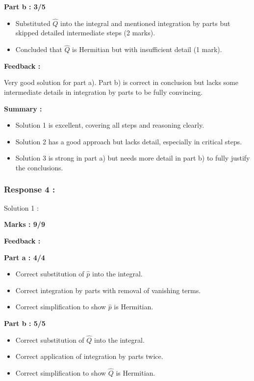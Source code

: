 \documentclass[a4paper,11pt]{article}
\begin{document}
\textbf{Part b : 3/5}

\begin{itemize}
    \item Substituted $\hat{Q}$ into the integral and mentioned integration by parts but skipped detailed intermediate steps (2 marks).
    \item Concluded that $\hat{Q}$ is Hermitian but with insufficient detail (1 mark).
\end{itemize}

\textbf{Feedback :}

Very good solution for part a). Part b) is correct in conclusion but lacks some intermediate details in integration by parts to be fully convincing.


\textbf{Summary :}
\begin{itemize}
    \item Solution 1 is excellent, covering all steps and reasoning clearly.
    \item Solution 2 has a good approach but lacks detail, especially in critical steps.
    \item Solution 3 is strong in part a) but needs more detail in part b) to fully justify the conclusions.
\end{itemize}


\subsubsection*{Response 4 :}

Solution 1 :

\textbf{Marks : 9/9}

\textbf{Feedback :}

\textbf{Part a : 4/4}

\begin{itemize}
    \item Correct substitution of $\hat{p}$ into the integral.
    \item Correct integration by parts with removal of vanishing terms.
    \item Correct simplification to show $\hat{p}$ is Hermitian. 
\end{itemize}


\textbf{Part b : 5/5}

\begin{itemize}
    \item Correct substitution of $\hat{Q}$ into the integral.
    \item Correct application of integration by parts twice.
    \item Correct simplification to show $\hat{Q}$ is Hermitian.
\end{itemize}
\end{document}
